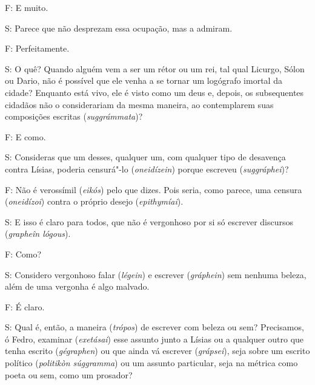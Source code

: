  

F: E muito.

S: Parece que não desprezam essa ocupação, mas a admiram.

F: Perfeitamente.

S: O quê? Quando alguém vem a ser um rétor ou um rei, tal qual Licurgo,
Sólon ou Dario, não é possível que ele venha a se tornar um logógrafo
imortal da cidade? \bekker{[258c]} Enquanto está vivo, ele é visto como um
deus e, depois, os
subsequentes cidadãos não o considerariam da mesma maneira, ao
contemplarem suas composições escritas (\emph{suggrámmata})?

F: E como.

S: Consideras que um desses, qualquer um, com qualquer tipo de desavença
contra Lísias, poderia censurá"-lo (\emph{oneidízein}) porque escreveu
(\emph{suggráphei})?

F: Não é verossímil (\emph{eikós}) pelo que dizes. Pois seria, como
parece, uma censura (\emph{oneidízoi}) contra o próprio desejo
(\emph{epithymíai}).

\bekker{[258d]} S: E isso é claro para todos, que não é vergonhoso por si só
escrever discursos (\emph{grapheîn lógous}).

F: Como?

S: Considero vergonhoso falar (\emph{légein}) e escrever
(\emph{gráphein}) sem nenhuma beleza, além de uma vergonha é algo
malvado.

F: É claro.

S: Qual é, então, a maneira (\emph{trópos}) de escrever com beleza ou sem?
Precisamos, ó Fedro, examinar (\emph{exetásai}) esse assunto junto a
Lísias ou a qualquer outro que tenha escrito (\emph{gégraphen}) ou que
ainda vá escrever (\emph{grápsei}), seja sobre um escrito político
(\emph{politikòn súggramma}) ou um assunto particular, seja na métrica
como poeta ou sem, como um prosador?

